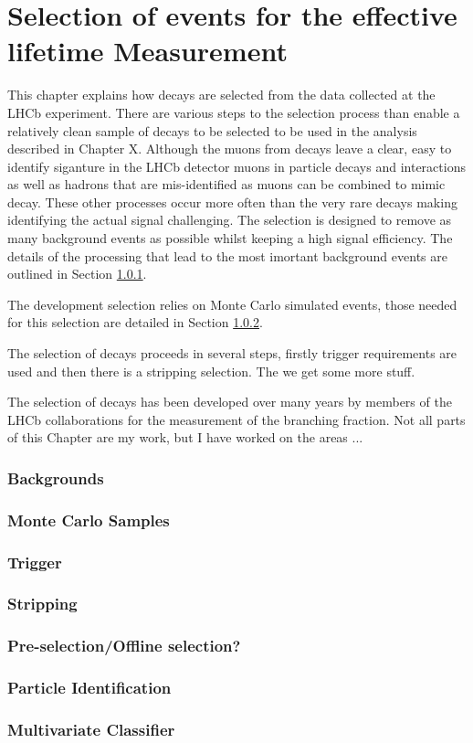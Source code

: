 \chapter{Selection of \bsmumu events for the effective lifetime Measurement}
\label{selection_chapter}

This chapter explains how \bsmumu decays are selected from the data collected at the LHCb experiment. There are various steps to the selection process than enable a relatively clean sample of \bsmumu decays to be selected to be used in the analysis described in Chapter X. Although the muons from \bsmumu decays leave a clear, easy to identify siganture in the LHCb detector muons in particle decays and interactions as well as hadrons that are mis-identified as muons can be combined to mimic \bsmumu decay. These other processes occur more often than the very rare \bsmumu decays making identifying the actual signal challenging. The selection is designed to remove as many background events as possible whilst keeping a high signal efficiency. The details of the processing that lead to the most imortant background events are outlined in Section \ref{sec:backgroundoutline}.

 The development selection relies on Monte Carlo simulated events, those needed for this selection are detailed in Section \ref{sec:MCsamples}. 

The selection of \bsmumu decays proceeds in several steps, firstly trigger requirements are used and then there is a stripping selection. The we get some more stuff.

The selection of \bsmumu decays has been developed over many years by members of the LHCb collaborations for the measurement of the \bsmumu branching fraction. Not all parts of this Chapter are my work, but I have worked on the areas ...


\subsection{Backgrounds}
\label{sec:backgroundoutline}


\subsection{Monte Carlo Samples}
\label{sec:MCsamples}


\subsection{Trigger}
\label{sec:triggerRequirements}

\subsection{Stripping}
\label{sec:stripping}


\subsection{Pre-selection/Offline selection?}

\subsection{Particle Identification}

\subsection{Multivariate Classifier}
